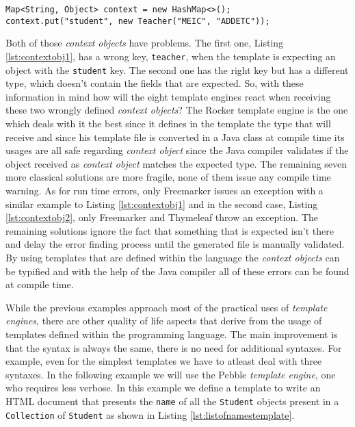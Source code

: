 \bigskip


\begin{minipage}{\linewidth}
\begin{lstlisting}[caption={Context Object}, label={lst:contextobj2}]
Map<String, Object> context = new HashMap<>();
context.put("student", new Teacher("MEIC", "ADDETC"));
\end{lstlisting}
\end{minipage} 

\noindent
Both of those \textit{context objects} have problems. The first one, Listing \ref{lst:contextobj1}, has a wrong key, \texttt{teacher}, when the template is expecting an object with the \texttt{student} key. The second one has the right key but has a different type, which doesn't contain the fields that are expected. So, with these information in mind how will the eight template engines react when receiving these two wrongly defined \textit{context objects}? The Rocker template engine is the one which deals with it the best since it defines in the template the type that will receive and since his template file is converted in a Java class at compile time its usages are all safe regarding \textit{context object} since the Java compiler validates if the object received as \textit{context object} matches the expected type. The remaining seven more classical solutions are more fragile, none of them issue any compile time warning. As for run time errors, only Freemarker issues an exception with a similar example to Listing \ref{lst:contextobj1} and in the second case, Listing \ref{lst:contextobj2}, only Freemarker and Thymeleaf throw an exception. The remaining solutions ignore the fact that something that is expected isn't there and delay the error finding process until the generated file is manually validated. By using templates that are defined within the language the \textit{context objects} can be typified and with the help of the Java compiler all of these errors can be found at compile time.

\noindent
While the previous examples approach most of the practical uses of \textit{template engines}, there are other quality of life aspects that derive from the usage of templates defined within the programming language. The main improvement is that the syntax is always the same, there is no need for additional syntaxes. For example, even for the simplest templates we have to atleast deal with three syntaxes. In the following example we will use the Pebble \textit{template engine}, one who requires less verbose. In this example we define a template to write an \ac{HTML} document that presents the \texttt{name} of all the \texttt{Student} objects present in a \texttt{Collection} of \texttt{Student} as shown in Listing \ref{lst:listofnamestemplate}.

